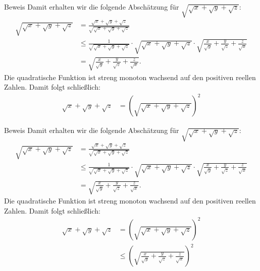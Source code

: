 \documentclass[10pt]{beamer}
\begin{document}
\begin{frame}{Beweis}
    Damit erhalten wir die folgende Abschätzung für \( \sqrt{\sqrt{x} + \sqrt{y} + \sqrt{z}} \):
    \begin{align*}
        \sqrt{\sqrt{x} + \sqrt{y} + \sqrt{z}}
        & = \frac{ \sqrt{x} + \sqrt{y} + \sqrt{z}}{\sqrt{\sqrt{x} + \sqrt{y} + \sqrt{z}}} \\
        & \leq \frac{1}{\sqrt{\sqrt{x} + \sqrt{y} + \sqrt{z}}} \cdot \sqrt{\sqrt{x} + \sqrt{y} + \sqrt{z}} \cdot \sqrt{\frac{x}{\sqrt{y}} + \frac{y}{\sqrt{z}} + \frac{z}{\sqrt{x}}} \\
        & = \sqrt{\frac{x}{\sqrt{y}} + \frac{y}{\sqrt{z}} + \frac{z}{\sqrt{x}}}.
    \end{align*}
    Die quadratische Funktion ist streng monoton wachsend auf den positiven reellen Zahlen. Damit folgt schließlich:
    \begin{align*}
         \sqrt{x} + \sqrt{y} + \sqrt{z}
        & = \left( \sqrt{\sqrt{x} + \sqrt{y} + \sqrt{z}} \right)^{2}
    \end{align*}
\end{frame}



\begin{frame}{Beweis}
    Damit erhalten wir die folgende Abschätzung für \( \sqrt{\sqrt{x} + \sqrt{y} + \sqrt{z}} \):
    \begin{align*}
        \sqrt{\sqrt{x} + \sqrt{y} + \sqrt{z}}
        & = \frac{ \sqrt{x} + \sqrt{y} + \sqrt{z}}{\sqrt{\sqrt{x} + \sqrt{y} + \sqrt{z}}} \\
        & \leq \frac{1}{\sqrt{\sqrt{x} + \sqrt{y} + \sqrt{z}}} \cdot \sqrt{\sqrt{x} + \sqrt{y} + \sqrt{z}} \cdot \sqrt{\frac{x}{\sqrt{y}} + \frac{y}{\sqrt{z}} + \frac{z}{\sqrt{x}}} \\
        & = \sqrt{\frac{x}{\sqrt{y}} + \frac{y}{\sqrt{z}} + \frac{z}{\sqrt{x}}}.
    \end{align*}
    Die quadratische Funktion ist streng monoton wachsend auf den positiven reellen Zahlen. Damit folgt schließlich:
    \begin{align*}
         \sqrt{x} + \sqrt{y} + \sqrt{z}
        & = \left( \sqrt{\sqrt{x} + \sqrt{y} + \sqrt{z}} \right)^{2} \\
        & \leq \left( \sqrt{\frac{x}{\sqrt{y}} + \frac{y}{\sqrt{z}} + \frac{z}{\sqrt{x}}} \right)^{2}
    \end{align*}
\end{frame}
\end{document}
